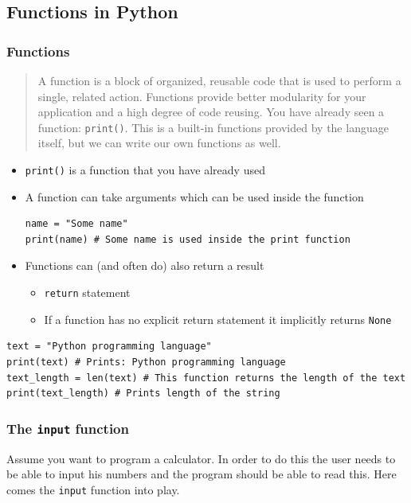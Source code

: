 \documentclass[10pt, a4paper]{beamer} %
\begin{document}
\subsection{Functions in Python} %
\label{sub:functions}
\begin{frame}\frametitle{Functions}
\begin{quote}
  A function is a block of organized, reusable code that is used to perform a single, related action.
  Functions provide better modularity for your application and a high degree of code reusing.
  You have already seen a function: \lstinline!print()!. 
  This is a built-in functions provided by the language itself, but we can write our own functions as well.
\end{quote}

\framebreak

\begin{itemize}
  \item \lstinline!print()! is a function that you have already used
  \item A function can take arguments which can be used inside the function
  \begin{lstlisting}
name = "Some name"
print(name) # Some name is used inside the print function
  \end{lstlisting}
  \item Functions can (and often do) also return a result
  \begin{itemize}
    \item \lstinline!return! statement
    \item If a function has no explicit return statement it implicitly returns \lstinline!None!
  \end{itemize}
\end{itemize}

\begin{examples}
  \begin{lstlisting}
text = "Python programming language"
print(text) # Prints: Python programming language
text_length = len(text) # This function returns the length of the text
print(text_length) # Prints length of the string
  \end{lstlisting}
\end{examples}
\framebreak
\frametitle{The \lstinline!input! function}

Assume you want to program a calculator.
In order to do this the user needs to be able to input his numbers and the program should be able to read this.
Here comes the \lstinline!input! function into play.


\end{frame}
\end{document}
